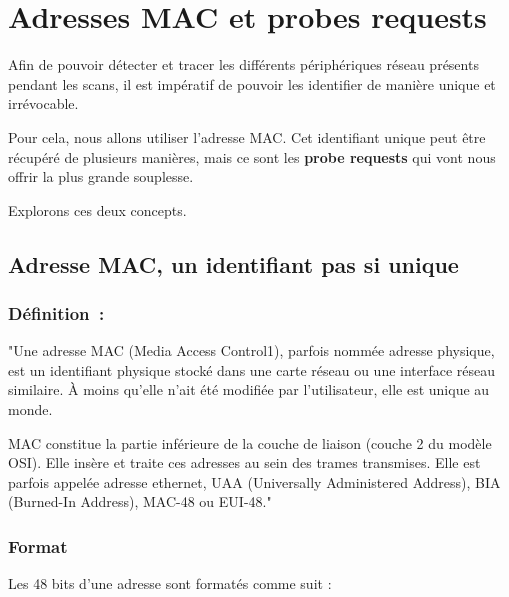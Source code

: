 \chapter{Adresses MAC et probes requests}
\label{ch:probe_req}

Afin de pouvoir détecter et tracer les différents périphériques réseau présents
pendant les scans, il est impératif de pouvoir les identifier de manière unique et irrévocable.

Pour cela, nous allons utiliser l'adresse MAC. 
Cet identifiant unique peut être récupéré de plusieurs manières, mais ce sont les \textbf{probe requests}
qui vont nous offrir la plus grande souplesse. 

Explorons ces deux concepts.

\section{Adresse MAC, un identifiant pas si unique}

\subsection{Définition~\cite{wiki:mac}:}

"Une adresse MAC (Media Access Control1), parfois nommée adresse physique, est un identifiant physique 
stocké dans une carte réseau ou une interface réseau similaire. À moins qu'elle n'ait été modifiée par l'utilisateur, elle est unique au monde. 

MAC constitue la partie inférieure de la couche de liaison (couche 2 du modèle OSI). Elle insère et traite ces adresses au sein des trames transmises. Elle est parfois appelée adresse ethernet, 
UAA (Universally Administered Address), BIA (Burned-In Address), MAC-48 ou EUI-48."

\subsection{Format}

Les 48 bits d'une adresse sont formatés comme suit :

